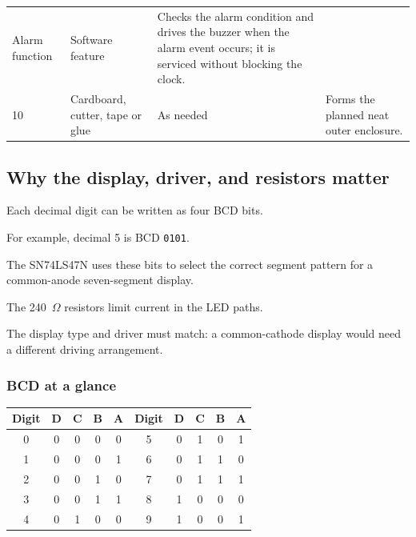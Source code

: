 \documentclass[12pt,letterpaper]{article}
\begin{document}
\begin{table}[H]
\begin{tabularx}{
    \textwidth
  }{
    @{}p{9mm}Yp{24mm}Y@{}
  }
    Alarm function
    &
    Software feature
    &
    Checks the alarm condition and drives the buzzer when the
    alarm event occurs; it is serviced without blocking the clock.
    \\

    10
    &
    Cardboard, cutter, tape or glue
    &
    As needed
    &
    Forms the planned neat outer enclosure.
    \\

    \bottomrule

  \end{tabularx}

\end{table}

\subsection{Why the display, driver, and resistors matter}

Each decimal digit can be written as four BCD bits.

For example, decimal 5 is BCD
\texttt{0101}.

The SN74LS47N uses these bits to select
the correct segment pattern
for a common-anode seven-segment display.

The 240~$\Omega$ resistors limit current
in the LED paths.

The display type and driver must match:
a common-cathode display would need
a different driving arrangement.

\subsubsection*{BCD at a glance}

\begin{center}

\small

\begin{tabular}{
c|cccc@{\qquad}c|cccc
}

\toprule

Digit & D & C & B & A
&
Digit & D & C & B & A
\\

\midrule

0 & 0 & 0 & 0 & 0
&
5 & 0 & 1 & 0 & 1
\\

1 & 0 & 0 & 0 & 1
&
6 & 0 & 1 & 1 & 0
\\

2 & 0 & 0 & 1 & 0
&
7 & 0 & 1 & 1 & 1
\\

3 & 0 & 0 & 1 & 1
&
8 & 1 & 0 & 0 & 0
\\

4 & 0 & 1 & 0 & 0
&
9 & 1 & 0 & 0 & 1
\\

\bottomrule

\end{tabular}

\end{center}
\end{document}
